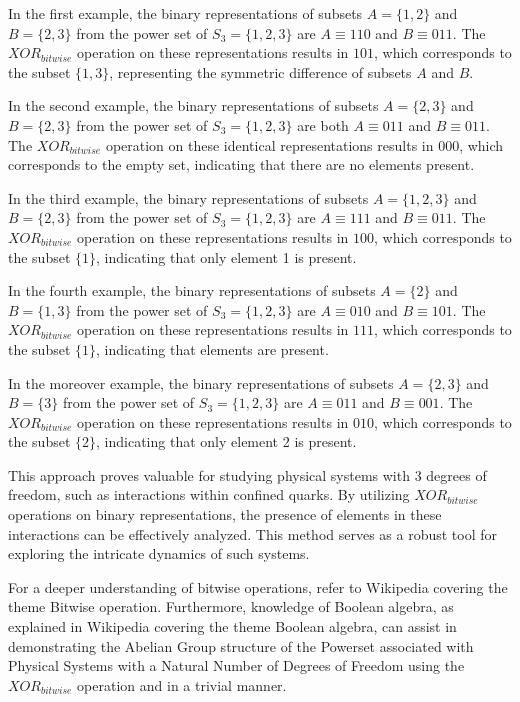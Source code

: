 \documentclass{article}
\begin{document}
In the first example, the binary representations of subsets $A=\{ 1,2 \}$ and $B=\{2,3\}$ from the power set of $S_3=\{1,2,3\}$ are $A\equiv110$ and $B\equiv011$. The $XOR_{bitwise}$ operation on these representations results in $101$, which corresponds to the subset $\{1,3\}$, representing the symmetric difference of subsets $A$ and $B$.

In the second example, the binary representations of subsets $A=\{2,3\}$ and $B=\{2,3\}$ from the power set of $S_3=\{1,2,3\}$ are both $A\equiv011$ and $B\equiv011$. The $XOR_{bitwise}$ operation on these identical representations results in $000$, which corresponds to the empty set, indicating that there are no elements present.

In the third example, the binary representations of subsets $A=\{1,2,3\}$ and $B=\{2,3\}$ from the power set of $S_3=\{1,2,3\}$ are $A\equiv111$ and $B\equiv011$. The $XOR_{bitwise}$ operation on these representations results in $100$, which corresponds to the subset $\{1\}$, indicating that only element 1 is present.

In the fourth example, the binary representations of subsets $A=\{2\}$ and $B=\{1,3\}$ from the power set of $S_3=\{1,2,3\}$ are $A\equiv 010$ and $B\equiv 101$. The $XOR_{bitwise}$ operation on these representations results in $111$, which corresponds to the subset $\{1\}$, indicating that elements are present.

In the moreover example, the binary representations of subsets $A=\{2,3\}$ and $B=\{3\}$ from the power set of $S_3=\{1,2,3\}$ are $A \equiv 011 $ and $B\equiv 001$. The $XOR_{bitwise}$ operation on these representations results in $010$, which corresponds to the subset $\{2\}$, indicating that only element 2 is present.

This approach proves valuable for studying physical systems with 3 degrees of freedom, such as interactions within confined quarks. By utilizing $XOR_{bitwise}$ operations on binary representations, the presence of elements in these interactions can be effectively analyzed. This method serves as a robust tool for exploring the intricate dynamics of such systems.

For a deeper understanding of bitwise operations, refer to Wikipedia covering the theme Bitwise operation. 
Furthermore, knowledge of Boolean algebra, as explained in Wikipedia covering the theme Boolean algebra, 
can assist in demonstrating the Abelian Group structure of the Powerset associated with Physical Systems with a Natural Number of Degrees of Freedom using the $XOR_{bitwise}$ operation and in a trivial manner.
\end{document}
